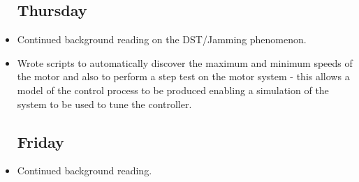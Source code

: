 \documentclass[a4]{report}
\begin{document}
\begin{itemize}
		\subsection*{Thursday}
		\item Continued background reading on the DST/Jamming phenomenon.
		\item Wrote scripts to automatically discover the maximum and minimum speeds of the motor and also to perform a step test on the motor system - this allows a model of the control process to be produced enabling a simulation of the system to be used to tune the controller.
		\subsection*{Friday}
		\item Continued background reading.
	\end{itemize}
	\newpage
\end{document}
